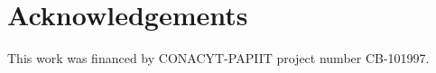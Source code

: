 \documentclass[letterpaper,10pt, jcp, aps]{revtex4-1}
\begin{document}
\section{Acknowledgements}


This work was financed by CONACYT-PAPIIT project number CB-101997.






\end{document}
